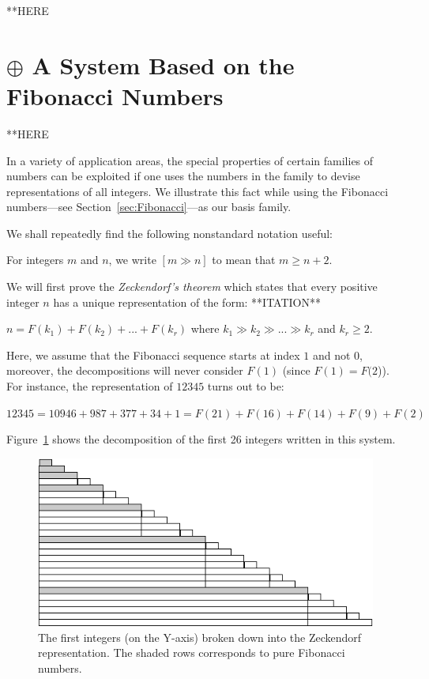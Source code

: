 **HERE


\section{$\oplus$ A System Based on the Fibonacci Numbers}
\label{sec:numerals-special-families}
\label{sec:Fibo-numbers}

**HERE


In a variety of application areas, the special properties of certain
families of numbers can be exploited if one uses the numbers in the
family to devise representations of all integers.  We illustrate this
fact while using the Fibonacci numbers---see
Section~\ref{sec:Fibonacci}---as our basis family.

\noindent
We shall repeatedly find the following nonstandard notation useful:

For integers $m$ and $n$, we write $[m \gg n]$ to mean that $m \geq
n+2$.

\medskip


We will first prove the \textit{Zeckendorf's theorem} which states
that every positive integer $n$ has a unique representation of the
form:  **ITATION**

$n = F(k_1) + F(k_2) + ... + F(k_r)$ where $k_1 \gg k_2 \gg ... \gg k_r$ and $k_r \geq 2$.

Here, we assume that the Fibonacci sequence starts at index $1$ and not $0$,
moreover, the decompositions will never consider $F(1)$ (since $F(1)=F(2$)). 
For instance, the representation of $12345$ turns out to be:

$12345 = 10946 + 987 + 377 + 34 + 1 = F(21) + F(16) + F(14) + F(9) + F(2)$
\bigskip

Figure~\ref{zeckendorf} shows the decomposition of the first 26 integers written in this system. 
\begin{figure}[h]
\begin{center}
        \includegraphics[scale=0.6]{FiguresArithmetic/Zeckendorf}
        \caption{The first integers (on the Y-axis) broken down into the Zeckendorf representation.
        The shaded rows corresponds to pure Fibonacci numbers.}
\label{zeckendorf}
\end{center}
\end{figure}

